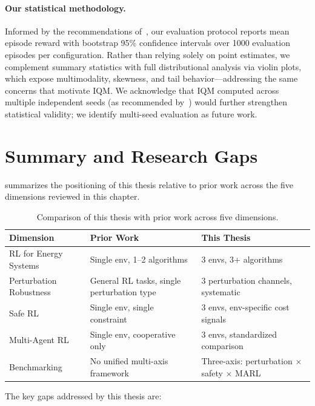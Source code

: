 \paragraph{Our statistical methodology.} Informed by the recommendations of~\citet{agarwal2021deep}, our evaluation protocol reports mean episode reward with bootstrap 95\% confidence intervals over 1000 evaluation episodes per configuration. Rather than relying solely on point estimates, we complement summary statistics with full distributional analysis via violin plots, which expose multimodality, skewness, and tail behavior---addressing the same concerns that motivate IQM. We acknowledge that IQM computed across multiple independent seeds (as recommended by~\citeauthor{agarwal2021deep}) would further strengthen statistical validity; we identify multi-seed evaluation as future work.

\section{Summary and Research Gaps}
\label{sec:lit_summary}

 summarizes the positioning of this thesis relative to prior work across the five dimensions reviewed in this chapter.

\begin{table}[htbp]
\centering
\caption{Comparison of this thesis with prior work across five dimensions.}
\label{tab:lit_comparison}
\begin{tabular}{@{}lll@{}}
\toprule
\textbf{Dimension} & \textbf{Prior Work} & \textbf{This Thesis} \\
\midrule
RL for Energy Systems & Single env, 1--2 algorithms & 3 envs, 3+ algorithms \\
Perturbation Robustness & General RL tasks, single perturbation type & 3 perturbation channels, systematic \\
Safe RL & Single env, single constraint & 3 envs, env-specific cost signals \\
Multi-Agent RL & Single env, cooperative only & 3 envs, standardized comparison \\
Benchmarking & No unified multi-axis framework & Three-axis: perturbation $\times$ safety $\times$ MARL \\
\bottomrule
\end{tabular}
\end{table}

The key gaps addressed by this thesis are:

